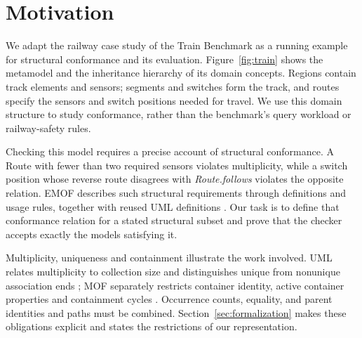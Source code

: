 \section{Motivation}\label{sec:motivation}

We adapt the railway case study of the Train Benchmark
\cite{szarnyas_etal_2018} as a running example for structural conformance and
its evaluation. Figure~\ref{fig:train} shows the metamodel and the inheritance
hierarchy of its domain concepts. Regions contain track elements and sensors;
segments and switches form the track, and routes specify the sensors and switch
positions needed for travel. We use this domain structure to study conformance,
rather than the benchmark's query workload or railway-safety rules.

Checking this model requires a precise account of structural conformance.
A Route with fewer than two required sensors violates multiplicity, while a
switch position whose reverse route disagrees with \emph{Route.follows}
violates the opposite relation. EMOF describes such structural requirements
through definitions and usage rules, together with reused UML definitions
\cite{omg_mof_251}. Our task is to define that conformance relation for a stated structural subset and prove that the
checker accepts exactly the models satisfying it.

Multiplicity, uniqueness and containment illustrate the work involved. UML
relates multiplicity to collection size and distinguishes unique from nonunique
association ends \cite{omg_uml_25}; MOF separately restricts container
identity, active container properties and containment cycles
\cite{omg_mof_251}. Occurrence counts, equality, and parent identities and paths
must be combined. Section~\ref{sec:formalization} makes these obligations
explicit and states the restrictions of our representation.
